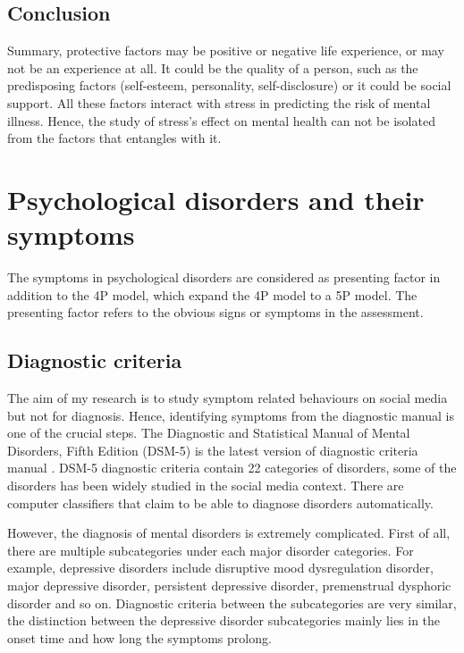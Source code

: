 \subsection{Conclusion}
Summary, protective factors may be positive or negative life experience, or may not be an experience at all. It could be the quality of a person, such as the predisposing factors (self-esteem, personality, self-disclosure) or it could be social support. All these factors interact with stress in predicting the risk of mental illness. Hence, the study of stress's effect on mental health can not be isolated from the factors that entangles with it. 


\section{Psychological disorders and their symptoms}

The symptoms in psychological disorders are considered as presenting factor in addition to the 4P model, which expand the 4P model to a 5P model. The presenting factor refers to the obvious signs or symptoms in the assessment.

\subsection{Diagnostic criteria}
The aim of my research is to study symptom related behaviours on social media but not for diagnosis. Hence, identifying symptoms from the diagnostic manual is one of the crucial steps. The Diagnostic and Statistical Manual of Mental Disorders, Fifth Edition (DSM-5) is the latest version of diagnostic criteria manual \cite{american2013diagnostic}. DSM-5 diagnostic criteria contain 22 categories of disorders, some of the disorders has been widely studied in the social media context. There are computer classifiers that claim to be able to diagnose disorders automatically.

However, the diagnosis of mental disorders is extremely complicated. First of all, there are multiple subcategories under each major disorder categories. For example, depressive disorders include disruptive mood dysregulation disorder, major depressive disorder, persistent depressive disorder, premenstrual dysphoric disorder and so on. Diagnostic criteria between the subcategories are very similar, the distinction between the depressive disorder subcategories mainly lies in the onset time and how long the symptoms prolong. 

